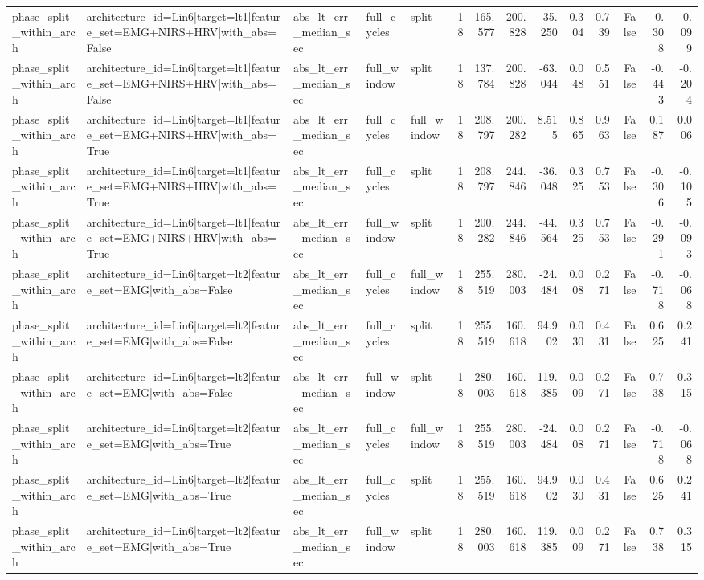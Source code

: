 \begin{table}
\begin{tabular}{lllllrrrrrrrrr}
phase_split_within_arch & architecture_id=Lin6|target=lt1|feature_set=EMG+NIRS+HRV|with_abs=False & abs_lt_err_median_sec & full_cycles & split & 18 & 165.577 & 200.828 & -35.250 & 0.304 & 0.739 & False & -0.308 & -0.099 \\
phase_split_within_arch & architecture_id=Lin6|target=lt1|feature_set=EMG+NIRS+HRV|with_abs=False & abs_lt_err_median_sec & full_window & split & 18 & 137.784 & 200.828 & -63.044 & 0.048 & 0.551 & False & -0.443 & -0.204 \\
phase_split_within_arch & architecture_id=Lin6|target=lt1|feature_set=EMG+NIRS+HRV|with_abs=True & abs_lt_err_median_sec & full_cycles & full_window & 18 & 208.797 & 200.282 & 8.515 & 0.865 & 0.963 & False & 0.187 & 0.006 \\
phase_split_within_arch & architecture_id=Lin6|target=lt1|feature_set=EMG+NIRS+HRV|with_abs=True & abs_lt_err_median_sec & full_cycles & split & 18 & 208.797 & 244.846 & -36.048 & 0.325 & 0.753 & False & -0.306 & -0.105 \\
phase_split_within_arch & architecture_id=Lin6|target=lt1|feature_set=EMG+NIRS+HRV|with_abs=True & abs_lt_err_median_sec & full_window & split & 18 & 200.282 & 244.846 & -44.564 & 0.325 & 0.753 & False & -0.291 & -0.093 \\
phase_split_within_arch & architecture_id=Lin6|target=lt2|feature_set=EMG|with_abs=False & abs_lt_err_median_sec & full_cycles & full_window & 18 & 255.519 & 280.003 & -24.484 & 0.008 & 0.271 & False & -0.718 & -0.068 \\
phase_split_within_arch & architecture_id=Lin6|target=lt2|feature_set=EMG|with_abs=False & abs_lt_err_median_sec & full_cycles & split & 18 & 255.519 & 160.618 & 94.902 & 0.030 & 0.431 & False & 0.625 & 0.241 \\
phase_split_within_arch & architecture_id=Lin6|target=lt2|feature_set=EMG|with_abs=False & abs_lt_err_median_sec & full_window & split & 18 & 280.003 & 160.618 & 119.385 & 0.009 & 0.271 & False & 0.738 & 0.315 \\
phase_split_within_arch & architecture_id=Lin6|target=lt2|feature_set=EMG|with_abs=True & abs_lt_err_median_sec & full_cycles & full_window & 18 & 255.519 & 280.003 & -24.484 & 0.008 & 0.271 & False & -0.718 & -0.068 \\
phase_split_within_arch & architecture_id=Lin6|target=lt2|feature_set=EMG|with_abs=True & abs_lt_err_median_sec & full_cycles & split & 18 & 255.519 & 160.618 & 94.902 & 0.030 & 0.431 & False & 0.625 & 0.241 \\
phase_split_within_arch & architecture_id=Lin6|target=lt2|feature_set=EMG|with_abs=True & abs_lt_err_median_sec & full_window & split & 18 & 280.003 & 160.618 & 119.385 & 0.009 & 0.271 & False & 0.738 & 0.315 \\

\end{tabular}
\end{table}
